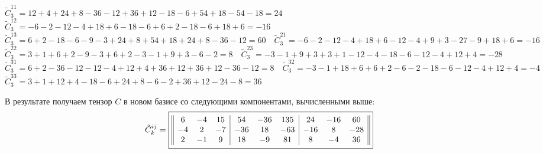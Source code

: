 \documentclass{article}
\newcommand*\squared[1]{\tikz[baseline=(char.base)]{
            \node[shape=rectangle,draw,inner sep=4pt] (char) {#1};}}
\begin{document}
\begin{center}
$\tilde{C}^{11}_3 = 12+4+24+8-36-12+36+12-18-6+54+18-54-18 = 24$ \\ $\tilde{C}^{12}_3 = -6-2-12-4+18+6-18-6+6+2-18-6+18+6 = -16$ \\
$\tilde{C}^{13}_3 = 6+2-18-6-9-3+24+8+54+18+24+8-36-12 = 60 \quad \tilde{C}^{21}_3 = -6-2-12-4+18+6-12-4+9+3-27-9+18+6 = -16$ \\
$\tilde{C}^{22}_3 = 3+1+6+2-9-3+6+2-3-1+9+3-6-2 = 8 \quad \tilde{C}^{23}_3 = -3-1+9+3+3+1-12-4-18-6-12-4+12+4 = -28$ \\
$\tilde{C}^{31}_3 = 6+2-36-12-12-4+12+4+36+12+36+12-36-12 = 8 \quad \tilde{C}^{32}_3 = -3-1+18+6+6+2-6-2-18-6-12-4+12+4 = -4$ \\
$\tilde{C}^{33}_3 = 3+1+12+4-18-6+24+8-6-2+36+12-24-8 = 36$
\end{center}
В результате получаем тензор $C$ в новом базисе со следующими компонентами, вычисленными выше:
$$\tilde{C}^{ij}_{k} = \squared{$\begin{array}{||ccc|ccc|ccc||}
6 & -4 & 15 & 54 & -36 & 135 & 24 & -16 & 60 \\
-4 & 2 & -7 & -36 & 18 & -63 & -16 & 8 & -28 \\
2 & -1 & 9 & 18 & -9 & 81 & 8 & -4 & 36
\end{array}$}$$
\end{document}
